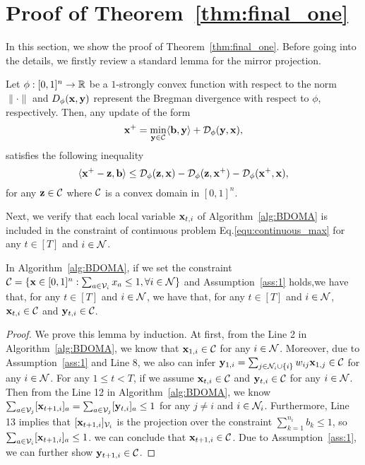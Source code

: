  \section{Proof of Theorem~\ref{thm:final_one}}\label{appendix:1}
	In this section, we show the proof of Theorem~\ref{thm:final_one}.
	Before going into the details, we firstly review a standard lemma for the mirror projection.
	\begin{lemma}\label{lemma:1}
		Let $\phi:[0,1]^{n}\rightarrow\mathbb{R}$ be a $1$-strongly convex function with respect to the norm $\|\cdot \|$  and $D_{\phi}(\mathbf{x},\mathbf{y})$ represent the Bregman divergence with respect to $\phi$, respectively. Then,  any update of the form 
		\begin{equation*}
			\mathbf{x}^{+}=\min_{\mathbf{y}\in\mathcal{C}}\langle\textbf{b},\mathbf{y}\rangle+\mathcal{D}_{\phi}(\mathbf{y},\mathbf{x}),
		\end{equation*} satisfies the following inequality
		\begin{equation*}
			\langle\mathbf{x}^{+}-\mathbf{z},\textbf{b}\rangle\le \mathcal{D}_{\phi}(\mathbf{z},\mathbf{x})-\mathcal{D}_{\phi}(\mathbf{z},\mathbf{x}^{+})-\mathcal{D}_{\phi}(\mathbf{x}^{+},\mathbf{x}),
		\end{equation*} for any $\mathbf{z}\in\mathcal{C}$ where $\mathcal{C}$ is a  convex domain  in $[0,1]^{n}$.
	\end{lemma} 
	Next, we verify that each local variable $\mathbf{x}_{t,i}$ of Algorithm~\ref{alg:BDOMA} is included in the constraint of continuous problem Eq.\eqref{equ:continuous_max}  for any $t\in[T]$ and $i\in\mathcal{N}$.
	\begin{lemma}\label{lemma:included_convex_constaint}
	In Algorithm~\ref{alg:BDOMA}, if we set the constraint $\mathcal{C}=\{\mathbf{x}\in[0,1]^{n}: \sum_{a\in\mathcal{V}_{i}}x_{a}\le1,\forall i\in\mathcal{N}\}$ and Assumption~\ref{ass:1} holds,we have that, for any $t\in[T]$ and $i\in\mathcal{N}$,  we have that, for any $t\in[T]$ and $i\in\mathcal{N}$, $\mathbf{x}_{t,i}\in\mathcal{C}$ and $\mathbf{y}_{t,i}\in\mathcal{C}$.
	\end{lemma}
	\begin{proof}
	We prove this lemma by induction.
	At first, from the Line 2 in Algorithm~\ref{alg:BDOMA}, we know that $\mathbf{x}_{1,i}\in\mathcal{C}$ for any $i\in\mathcal{N}$. Moreover, due to Assumption~\ref{ass:1} and Line 8, we also can infer $\mathbf{y}_{1,i}=\sum_{j\in\mathcal{N}_{i}\cup\{i\}}w_{ij}\mathbf{x}_{1,j}\in\mathcal{C}$ for any $i\in\mathcal{N}$.
	For any $1\le t<T$, if we assume $\mathbf{x}_{t,i}\in\mathcal{C}$ and $\mathbf{y}_{t,i}\in\mathcal{C}$ for any $i\in\mathcal{N}$. Then from the Line 12 in Algorithm~\ref{alg:BDOMA}, we know $\sum_{a\in\mathcal{V}_{j}}[\mathbf{x}_{t+1,i}]_{a}=\sum_{a\in\mathcal{V}_{j}}[\mathbf{y}_{t,i}]_{a}\le1$ for any $j\neq i$ and $i\in\mathcal{N}_{i}$. Furthermore, Line 13 implies that $[\mathbf{x}_{t+1,i}]_{\mathcal{V}_{i}}$ is the projection over the constraint $\sum_{k=1}^{n_{i}}b_{k}\le1$, so $\sum_{a\in\mathcal{V}_{i}}[\mathbf{x}_{t+1,i}]_{a}\le1$. we can conclude that $\mathbf{x}_{t+1,i}\in\mathcal{C}$. Due to  Assumption~\ref{ass:1}, we can further show $\mathbf{y}_{t+1,i}\in\mathcal{C}$.
	\end{proof}
